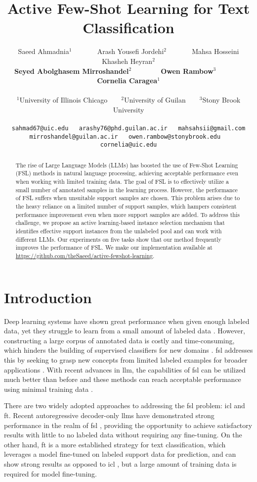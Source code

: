 \documentclass[11pt]{article}
\title{Active Few-Shot Learning for Text Classification}
\author{Saeed Ahmadnia$^1$ \mbox{   } \mbox{   } \mbox{   } \mbox{   } Arash Yousefi Jordehi$^2$ \mbox{   } \mbox{   } \mbox{   } \mbox{   } Mahsa Hosseini Khasheh Heyran$^2$\\
\textbf{Seyed Abolghasem Mirroshandel$^2$  \mbox{   } \mbox{   }  \mbox{   } \mbox{   } Owen 
Rambow$^3$  \mbox{   } \mbox{   } \mbox{   } \mbox{   } Cornelia Caragea$^1$}\\
\vspace{-0.9em}\\
  $^1$University of Illinois Chicago  \mbox{   } \mbox{   } $^2$University of Guilan  \mbox{   } \mbox{   } $^3$Stony Brook University \\
  \vspace{-0.9em}\\
  \texttt{\color{blue}sahmad67@uic.edu \mbox{  } arashy76@phd.guilan.ac.ir \mbox{  } mahsahsii@gmail.com}\\ \texttt{\color{blue}mirroshandel@guilan.ac.ir \mbox{  } owen.rambow@stonybrook.edu \mbox{  } cornelia@uic.edu}
}
\theoremstyle{definition}
\begin{document}
\maketitle

\begin{abstract}
The rise of Large Language Models (LLMs) has boosted the use of Few-Shot Learning (FSL) methods in natural language processing, achieving acceptable performance even when working with limited training data.
The goal of FSL is to effectively utilize 
a small number of annotated samples in the learning process.
However, the performance of FSL suffers when unsuitable support samples are chosen.
This problem arises due to the heavy reliance on a limited number of support samples, which hampers consistent performance improvement even when more support samples are added.
To address this challenge, we propose an active learning-based instance selection mechanism that identifies effective support instances from the unlabeled pool and can work with different LLMs.
Our experiments on five tasks show that our method frequently improves the performance of FSL.
We make our implementation available at \href{https://github.com/theSaeed/active-fewshot-learning}{https://github.com/theSaeed/active-fewshot-learning}.

\end{abstract}

\section{Introduction} \label{sec:intro}

Deep learning systems have shown great performance when given enough labeled data, yet they struggle to learn from a small amount of labeled data \cite{Sun_2019_CVPR}.
However, constructing a large corpus of annotated data is costly and time-consuming, which hinders the building of supervised classifiers for new domains \cite{zhu2009active}.
\gls*{fsl} addresses this by seeking to grasp new concepts from limited labeled examples for broader applications \cite{Sun_2019_CVPR}.
With recent advances in \gls*{llm}, the capabilities of \gls*{fsl} can be utilized much better than before and these methods can reach acceptable performance using minimal training data \cite{gao-etal-2021-making, chen-etal-2021-revisiting, karimi-mahabadi-etal-2022-prompt, lin2022few}.

There are two widely adopted approaches to addressing the \gls*{fsl} problem: \gls*{icl} and \gls*{ft}. Recent autoregressive decoder-only \gls*{llm}s have demonstrated strong performance in the realm of \gls*{fsl} \cite{NEURIPS2020_1457c0d6}, providing the opportunity to achieve satisfactory results with little to no labeled data without requiring any fine-tuning. 
On the other hand, \gls*{ft} is a more established strategy for text classification, which leverages a model fine-tuned on labeled support data for prediction, and can show strong results as opposed to \gls*{icl} \cite{edwards-camacho-collados-2024-language}, but a large amount of training data is required for model fine-tuning.
\end{document}
